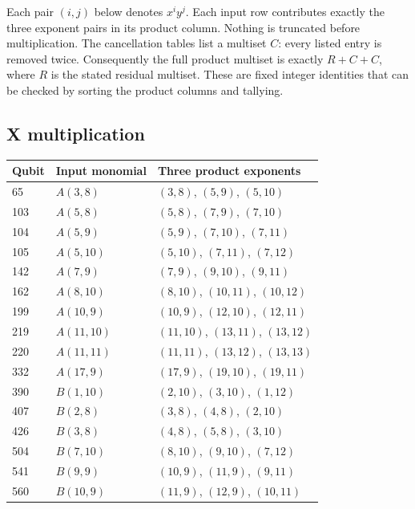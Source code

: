 \documentclass{article}
\begin{document}
Each pair \((i,j)\) below denotes \(x^i y^j\). Each input row contributes exactly
the three exponent pairs in its product column. Nothing is truncated before
multiplication. The cancellation tables list a multiset \(C\): every listed
entry is removed twice. Consequently the full product multiset is exactly
\(R + C + C\), where \(R\) is the stated residual multiset. These are fixed integer
identities that can be checked by sorting the product columns and tallying.

\subsection{X multiplication}\label{sec:x-multiplication}

\begin{center}
\begin{tabular}{lll}
  Qubit & Input monomial & Three product exponents \\
  \hline
  65 & \(A(3, 8)\) & \((3, 8)\), \((5, 9)\), \((5, 10)\) \\
  103 & \(A(5, 8)\) & \((5, 8)\), \((7, 9)\), \((7, 10)\) \\
  104 & \(A(5, 9)\) & \((5, 9)\), \((7, 10)\), \((7, 11)\) \\
  105 & \(A(5, 10)\) & \((5, 10)\), \((7, 11)\), \((7, 12)\) \\
  142 & \(A(7, 9)\) & \((7, 9)\), \((9, 10)\), \((9, 11)\) \\
  162 & \(A(8, 10)\) & \((8, 10)\), \((10, 11)\), \((10, 12)\) \\
  199 & \(A(10, 9)\) & \((10, 9)\), \((12, 10)\), \((12, 11)\) \\
  219 & \(A(11, 10)\) & \((11, 10)\), \((13, 11)\), \((13, 12)\) \\
  220 & \(A(11, 11)\) & \((11, 11)\), \((13, 12)\), \((13, 13)\) \\
  332 & \(A(17, 9)\) & \((17, 9)\), \((19, 10)\), \((19, 11)\) \\
  390 & \(B(1, 10)\) & \((2, 10)\), \((3, 10)\), \((1, 12)\) \\
  407 & \(B(2, 8)\) & \((3, 8)\), \((4, 8)\), \((2, 10)\) \\
  426 & \(B(3, 8)\) & \((4, 8)\), \((5, 8)\), \((3, 10)\) \\
  504 & \(B(7, 10)\) & \((8, 10)\), \((9, 10)\), \((7, 12)\) \\
  541 & \(B(9, 9)\) & \((10, 9)\), \((11, 9)\), \((9, 11)\) \\
  560 & \(B(10, 9)\) & \((11, 9)\), \((12, 9)\), \((10, 11)\) \\

\end{tabular}
\end{center}
\end{document}
